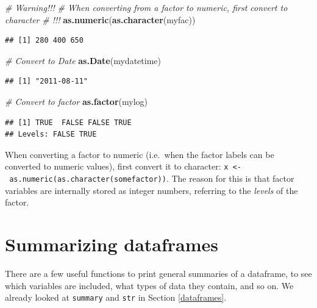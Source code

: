 \documentclass[]{book}
\newenvironment{Shaded}{\begin{snugshade}}{\end{snugshade}}
\newcommand{\CommentTok}[1]{\textcolor[rgb]{0.56,0.35,0.01}{\textit{#1}}}
\newcommand{\KeywordTok}[1]{\textcolor[rgb]{0.13,0.29,0.53}{\textbf{#1}}}
\newcommand{\NormalTok}[1]{#1}
\let\BeginKnitrBlock\begin \let\EndKnitrBlock\end
\begin{document}
\begin{Shaded}
\begin{Highlighting}[]
\CommentTok{# Warning!!!}
\CommentTok{# When converting from a factor to numeric, first convert to character}
\CommentTok{# !!!}
\KeywordTok{as.numeric}\NormalTok{(}\KeywordTok{as.character}\NormalTok{(myfac))}
\end{Highlighting}
\end{Shaded}

\begin{verbatim}
## [1] 280 400 650
\end{verbatim}

\begin{Shaded}
\begin{Highlighting}[]
\CommentTok{# Convert to Date}
\KeywordTok{as.Date}\NormalTok{(mydatetime)}
\end{Highlighting}
\end{Shaded}

\begin{verbatim}
## [1] "2011-08-11"
\end{verbatim}

\begin{Shaded}
\begin{Highlighting}[]
\CommentTok{# Convert to factor}
\KeywordTok{as.factor}\NormalTok{(mylog)}
\end{Highlighting}
\end{Shaded}

\begin{verbatim}
## [1] TRUE  FALSE FALSE TRUE 
## Levels: FALSE TRUE
\end{verbatim}

\BeginKnitrBlock{rmdcaution}
When converting a factor to numeric (i.e.~when the factor labels can be converted to numeric values), first convert it to character: \texttt{x\ \textless{}-\ as.numeric(as.character(somefactor))}. The reason for this is that factor variables are internally stored as integer numbers, referring to the \emph{levels} of the factor.
\EndKnitrBlock{rmdcaution}

\hypertarget{summarizing-dataframes}{%
\section{Summarizing dataframes}\label{summarizing-dataframes}}

There are a few useful functions to print general summaries of a dataframe, to see which variables are included, what types of data they contain, and so on. We already looked at \texttt{summary} and \texttt{str} in Section \ref{dataframes}.
\end{document}
